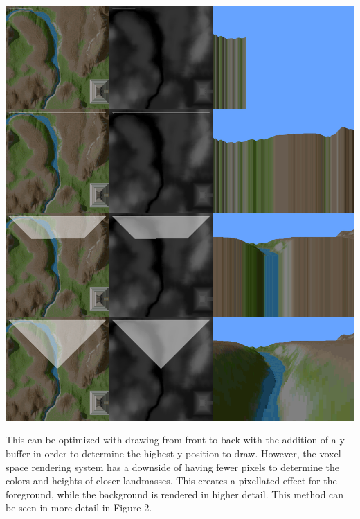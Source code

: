\documentclass[10pt]{report}
\begin{document}
		\begin{minipage}{\textwidth}
			\centering
			\includegraphics[scale=.2]{line-by-line}
			\label{fig:fig1}
		\end{minipage}
	
		This can be optimized with drawing from front-to-back with the addition of a y-buffer in order to determine the highest y position to draw. However, the voxel-space rendering system has a downside of having fewer pixels to determine the colors and heights of closer landmasses. This creates a pixellated effect for the foreground, while the background is rendered in higher detail. This method can be seen in more detail in Figure 2. 
		 
\end{document}
